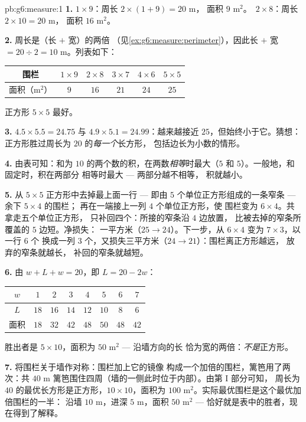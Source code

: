 \begin{solution}{pb:g6:measure:1}
\textbf{1.} $1 \times 9$：周长 $2 \times (1 + 9) = 20$ m，
面积 $9$ m$^2$。\ $2 \times 8$：周长 $2 \times 10 = 20$ m，
面积 $16$ m$^2$。

\textbf{2.} 周长是（长 $+$ 宽）的两倍
（见\cref{ex:g6:measure:perimeter}），因此长 $+$ 宽
$= 20 \div 2 = 10$ m。列表如下：
\begin{center}
\renewcommand{\arraystretch}{1.2}
\begin{tabular}{c|ccccc}
围栏 & $1 \times 9$ & $2 \times 8$ & $3 \times 7$ & $4 \times 6$
& $5 \times 5$ \\
\hline
面积（m$^2$） & $9$ & $16$ & $21$ & $24$ & $25$ \\
\end{tabular}
\end{center}
正方形 $5 \times 5$ 最好。

\textbf{3.} $4.5 \times 5.5 = 24.75$ 与 $4.9 \times 5.1 =
24.99$：越来越接近 $25$，但始终小于它。猜想：
正方形胜过周长为 $20$ 的\emph{每一个}长方形，
包括边长为小数的情形。

\textbf{4.} 由表可知：和为
$10$ 的两个数的积，在两数\emph{相等}时最大（$5$ 和
$5$）。一般地，和固定时，积在两部分
相等时最大 --- 两部分越不相等，
积就越小。

\textbf{5.} 从 $5 \times 5$ 正方形中去掉最上面一行
--- 即由 $5$ 个单位正方形组成的一条窄条 --- 余下 $5 \times 4$ 的围栏；
再在一端接上一列 $4$ 个单位正方形，使
围栏变为 $6 \times 4$。共拿走五个单位正方形，
只补回四个：所接的窄条沿 $4$ 边放置，
比被去掉的窄条所覆盖的 $5$ 边短。净损失：
一平方米（$25 \to 24$）。下一步，从
$6 \times 4$ 变为 $7 \times 3$，以一行 $6$ 个
换成一列 $3$ 个，又损失三平方米（$24 \to 21$）：围栏离正方形越远，
放弃的窄条就越长，
补回的窄条就越短。

\textbf{6.} 由 $w + L + w = 20$，即 $L = 20 - 2w$：
\begin{center}
\renewcommand{\arraystretch}{1.2}
\begin{tabular}{c|ccccccc}
$w$ & $1$ & $2$ & $3$ & $4$ & $5$ & $6$ & $7$ \\
\hline
$L$ & $18$ & $16$ & $14$ & $12$ & $10$ & $8$ & $6$ \\
面积 & $18$ & $32$ & $42$ & $48$ & $50$ & $48$ & $42$ \\
\end{tabular}
\end{center}
胜出者是 $5 \times 10$，面积为 $50$ m$^2$ --- 沿墙方向的长
恰为宽的两倍：\emph{不是}正方形。

\textbf{7.} 将围栏关于墙作对称：围栏加上它的镜像
构成一个加倍的围栏，篱笆用了两次：共 $40$ m
篱笆围住四周（墙的一侧此时位于内部）。由第 I 部分可知，
周长为 $40$ 的最优长方形是正方形，$10 \times
10$，面积为 $100$ m$^2$。实际最优围栏是这个最优加倍围栏的一半：
沿墙 $10$ m，进深 $5$ m，面积
$50$ m$^2$ --- 恰好就是表中的胜者，现在得到了解释。


\end{solution}
